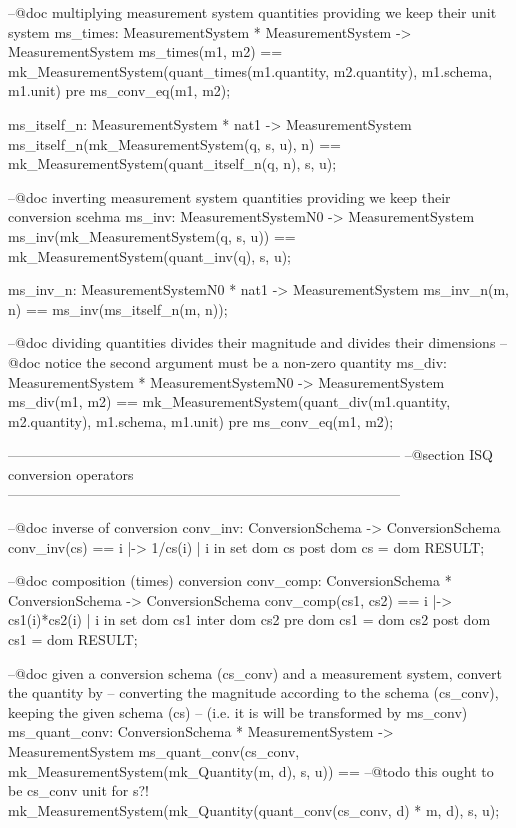 \documentclass[a4paper]{article}
\begin{document}
\begin{vdm_al}
 --@doc multiplying measurement system quantities providing we keep their unit system
 ms_times: MeasurementSystem * MeasurementSystem -> MeasurementSystem
 ms_times(m1, m2) == 
  mk_MeasurementSystem(quant_times(m1.quantity, m2.quantity), m1.schema, m1.unit)
 pre
  ms_conv_eq(m1, m2);
 
 ms_itself_n: MeasurementSystem * nat1 -> MeasurementSystem
 ms_itself_n(mk_MeasurementSystem(q, s, u), n) == 
  mk_MeasurementSystem(quant_itself_n(q, n), s, u);  

 --@doc inverting measurement system quantities providing we keep their conversion scehma
 ms_inv: MeasurementSystemN0 -> MeasurementSystem
 ms_inv(mk_MeasurementSystem(q, s, u)) == mk_MeasurementSystem(quant_inv(q), s, u);
  
 ms_inv_n: MeasurementSystemN0 * nat1 -> MeasurementSystem
 ms_inv_n(m, n) == ms_inv(ms_itself_n(m, n));
  
 --@doc dividing quantities divides their magnitude and divides their dimensions
 --@doc notice the second argument must be a non-zero quantity
 ms_div: MeasurementSystem * MeasurementSystemN0 -> MeasurementSystem
 ms_div(m1, m2) == mk_MeasurementSystem(quant_div(m1.quantity, m2.quantity), m1.schema, m1.unit)
 pre 
  ms_conv_eq(m1, m2);
   
------------------------------------------------------------------------------------
--@section ISQ conversion operators
------------------------------------------------------------------------------------
 
 --@doc inverse of conversion  
 conv_inv: ConversionSchema -> ConversionSchema
 conv_inv(cs) == { i |-> 1/cs(i) | i in set dom cs }
 post
  dom cs = dom RESULT;
 
 --@doc composition (times) conversion
 conv_comp: ConversionSchema * ConversionSchema -> ConversionSchema
 conv_comp(cs1, cs2) == { i |-> cs1(i)*cs2(i) | i in set dom cs1 inter dom cs2 }
 pre
  dom cs1 = dom cs2
 post
  dom cs1 = dom RESULT;

 --@doc given a conversion schema (cs_conv) and a measurement system, convert the quantity by 
 --     converting the magnitude according to the schema (cs_conv), keeping the given schema (cs)
 --     (i.e. it is will be transformed by ms_conv)
 ms_quant_conv: ConversionSchema * MeasurementSystem -> MeasurementSystem
 ms_quant_conv(cs_conv, mk_MeasurementSystem(mk_Quantity(m, d), s, u)) ==
  --@todo this ought to be cs_conv unit for s?!
  mk_MeasurementSystem(mk_Quantity(quant_conv(cs_conv, d) * m, d), s, u);
  

\end{vdm_al}
\end{document}
